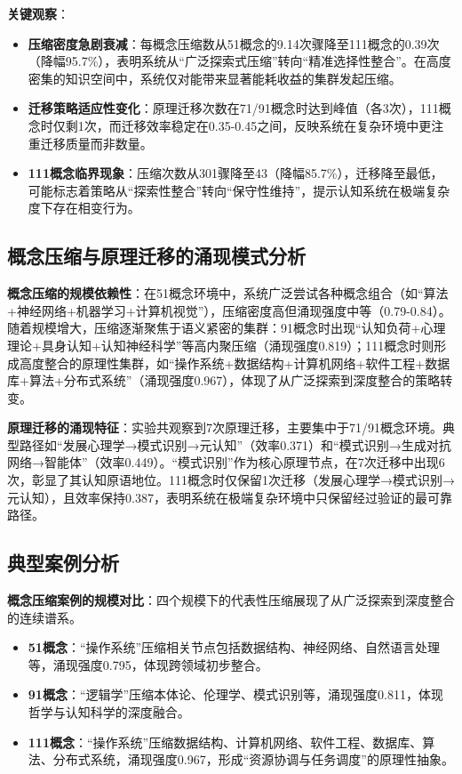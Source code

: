 \documentclass[12pt,a4paper]{article}
\begin{document}
\textbf{关键观察}：
\begin{itemize}
\item \textbf{压缩密度急剧衰减}：每概念压缩数从51概念的9.14次骤降至111概念的0.39次（降幅95.7\%），表明系统从“广泛探索式压缩”转向“精准选择性整合”。在高度密集的知识空间中，系统仅对能带来显著能耗收益的集群发起压缩。
\item \textbf{迁移策略适应性变化}：原理迁移次数在71/91概念时达到峰值（各3次），111概念时仅剩1次，而迁移效率稳定在0.35-0.45之间，反映系统在复杂环境中更注重迁移质量而非数量。
\item \textbf{111概念临界现象}：压缩次数从301骤降至43（降幅85.7\%），迁移降至最低，可能标志着策略从“探索性整合”转向“保守性维持”，提示认知系统在极端复杂度下存在相变行为。
\end{itemize}

\subsection{概念压缩与原理迁移的涌现模式分析}

\textbf{概念压缩的规模依赖性}：在51概念环境中，系统广泛尝试各种概念组合（如“算法+神经网络+机器学习+计算机视觉”），压缩密度高但涌现强度中等（0.79-0.84）。随着规模增大，压缩逐渐聚焦于语义紧密的集群：91概念时出现“认知负荷+心理理论+具身认知+认知神经科学”等高内聚压缩（涌现强度0.819）；111概念时则形成高度整合的原理性集群，如“操作系统+数据结构+计算机网络+软件工程+数据库+算法+分布式系统”（涌现强度0.967），体现了从广泛探索到深度整合的策略转变。

\textbf{原理迁移的涌现特征}：实验共观察到7次原理迁移，主要集中于71/91概念环境。典型路径如“发展心理学→模式识别→元认知”（效率0.371）和“模式识别→生成对抗网络→智能体”（效率0.449）。“模式识别”作为核心原理节点，在7次迁移中出现6次，彰显了其认知原语地位。111概念时仅保留1次迁移（发展心理学→模式识别→元认知），且效率保持0.387，表明系统在极端复杂环境中只保留经过验证的最可靠路径。

\subsection{典型案例分析}

\textbf{概念压缩案例的规模对比}：四个规模下的代表性压缩展现了从广泛探索到深度整合的连续谱系。
\begin{itemize}
\item \textbf{51概念}：“操作系统”压缩相关节点包括数据结构、神经网络、自然语言处理等，涌现强度0.795，体现跨领域初步整合。
\item \textbf{91概念}：“逻辑学”压缩本体论、伦理学、模式识别等，涌现强度0.811，体现哲学与认知科学的深度融合。
\item \textbf{111概念}：“操作系统”压缩数据结构、计算机网络、软件工程、数据库、算法、分布式系统，涌现强度0.967，形成“资源协调与任务调度”的原理性抽象。
\end{itemize}
\end{document}
